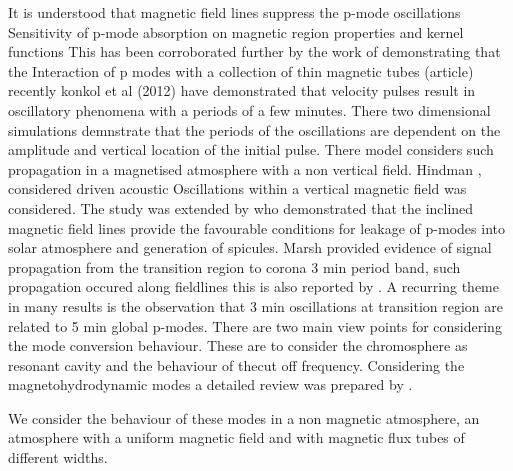 \documentclass[final,1p]{elsarticle}
\begin{document}
It is understood that magnetic field lines suppress the p-mode oscillations \cite{Gascoyne2011} Sensitivity of p-mode absorption on magnetic region properties and kernel functions This has been corroborated further by the work of \cite{Jain2011} demonstrating that the Interaction of p modes with a collection of thin magnetic tubes (article) recently konkol et al (2012)  \cite{Konkol2012} have demonstrated that velocity pulses result in oscillatory phenomena with a periods of a few minutes. There two dimensional simulations demnstrate that the periods of the oscillations are dependent on the  amplitude and vertical location of the initial pulse. There model considers such propagation in a magnetised atmosphere with a non vertical field. Hindman  \cite{Hindman1996}, considered driven acoustic Oscillations within a vertical magnetic field  was considered. The study was extended by \cite{James2003} who demonstrated that the inclined magnetic field lines provide the favourable conditions for leakage of p-modes into solar atmosphere and generation of spicules. Marsh \cite{Marsh2006} provided evidence of signal propagation from the transition region to corona 3 min period band, such propagation occured along fieldlines this is also reported by \cite{Zhukov2002}. A recurring theme in many results is the observation that 3 min oscillations at transition region are related to 5 min global p-modes. There are two main view points for considering the mode conversion behaviour. These are to consider the chromosphere as resonant cavity and the behaviour of thecut off frequency. Considering the magnetohydrodynamic modes  a detailed review was prepared by \cite{Khomenko2013}. 

 We consider the behaviour of these modes in a non magnetic atmosphere, an atmosphere with a uniform magnetic field and with magnetic flux tubes of different widths.




\end{document}
